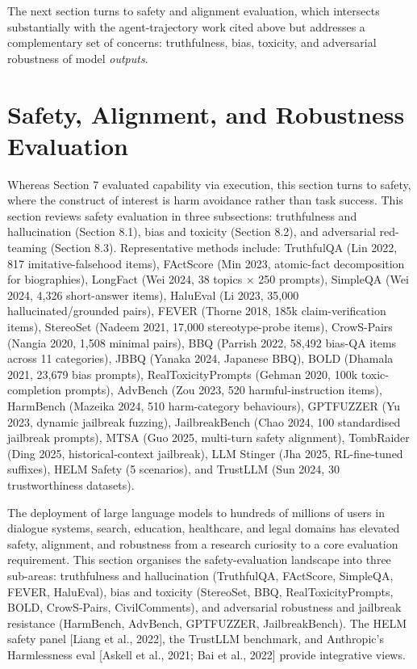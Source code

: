 The next section turns to safety and alignment evaluation, which intersects substantially with the agent-trajectory work cited above but addresses a complementary set of concerns: truthfulness, bias, toxicity, and adversarial robustness of model \emph{outputs}.

\section{Safety, Alignment, and Robustness Evaluation}\label{safety-alignment-and-robustness-evaluation}

Whereas Section 7 evaluated capability via execution, this section turns to safety, where the construct of interest is harm avoidance rather than task success. This section reviews safety evaluation in three subsections: truthfulness and hallucination (Section 8.1), bias and toxicity (Section 8.2), and adversarial red-teaming (Section 8.3). Representative methods include: TruthfulQA (Lin 2022, 817 imitative-falsehood items), FActScore (Min 2023, atomic-fact decomposition for biographies), LongFact (Wei 2024, 38 topics × 250 prompts), SimpleQA (Wei 2024, 4,326 short-answer items), HaluEval (Li 2023, 35,000 hallucinated/grounded pairs), FEVER (Thorne 2018, 185k claim-verification items), StereoSet (Nadeem 2021, 17,000 stereotype-probe items), CrowS-Pairs (Nangia 2020, 1,508 minimal pairs), BBQ (Parrish 2022, 58,492 bias-QA items across 11 categories), JBBQ (Yanaka 2024, Japanese BBQ), BOLD (Dhamala 2021, 23,679 bias prompts), RealToxicityPrompts (Gehman 2020, 100k toxic-completion prompts), AdvBench (Zou 2023, 520 harmful-instruction items), HarmBench (Mazeika 2024, 510 harm-category behaviours), GPTFUZZER (Yu 2023, dynamic jailbreak fuzzing), JailbreakBench (Chao 2024, 100 standardised jailbreak prompts), MTSA (Guo 2025, multi-turn safety alignment), TombRaider (Ding 2025, historical-context jailbreak), LLM Stinger (Jha 2025, RL-fine-tuned suffixes), HELM Safety (5 scenarios), and TrustLLM (Sun 2024, 30 trustworthiness datasets).

The deployment of large language models to hundreds of millions of users in dialogue systems, search, education, healthcare, and legal domains has elevated safety, alignment, and robustness from a research curiosity to a core evaluation requirement. This section organises the safety-evaluation landscape into three sub-areas: truthfulness and hallucination (TruthfulQA, FActScore, SimpleQA, FEVER, HaluEval), bias and toxicity (StereoSet, BBQ, RealToxicityPrompts, BOLD, CrowS-Pairs, CivilComments), and adversarial robustness and jailbreak resistance (HarmBench, AdvBench, GPTFUZZER, JailbreakBench). The HELM safety panel {[}Liang et al., 2022{]}, the TrustLLM benchmark, and Anthropic's Harmlessness eval {[}Askell et al., 2021; Bai et al., 2022{]} provide integrative views.

